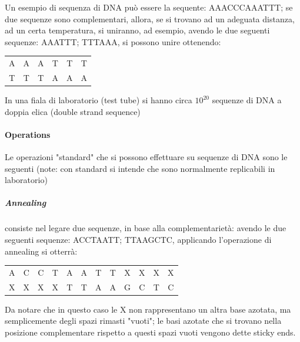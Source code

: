\documentclass[12pt,a4paper]{report}
\begin{document}
Un esempio di sequenza di DNA può essere la sequente: AAACCCAAATTT; se due sequenze sono complementari, allora, se si trovano ad un adeguata distanza, ad un certa temperatura, si uniranno, ad esempio, avendo le due seguenti sequenze: AAATTT; TTTAAA, si possono unire ottenendo:
\begin{center}
\begin{tabular}{ c c c c c c }
 A & A & A & T & T & T \\ 
 T & T & T & A & A & A
\end{tabular}
\end{center}
In una fiala di laboratorio (test tube) si hanno circa $10^{20}$ sequenze di DNA a doppia elica (double strand sequence)

\paragraph{Operations}
Le operazioni "standard" che si possono effettuare su sequenze di DNA sono le seguenti (note: con standard si intende che sono normalmente replicabili in laboratorio)

\subparagraph{Annealing}
consiste nel legare due sequenze, in base alla complementarietà: avendo le due seguenti sequenze: ACCTAATT; TTAAGCTC, applicando l'operazione di annealing si otterrà:
\begin{center}
\begin{tabular}{ c c c c c c c c c c c c }
 A & C & C & T & A & A & T & T & X & X & X & X \\ 
 X & X & X & X & T & T & A & A & G & C & T & C
\end{tabular}
\end{center}
Da notare che in questo caso le X non rappresentano un altra base azotata, ma semplicemente degli spazi rimasti "vuoti"; le basi azotate che si trovano nella posizione complementare rispetto a questi spazi vuoti vengono dette sticky ends.
\end{document}
